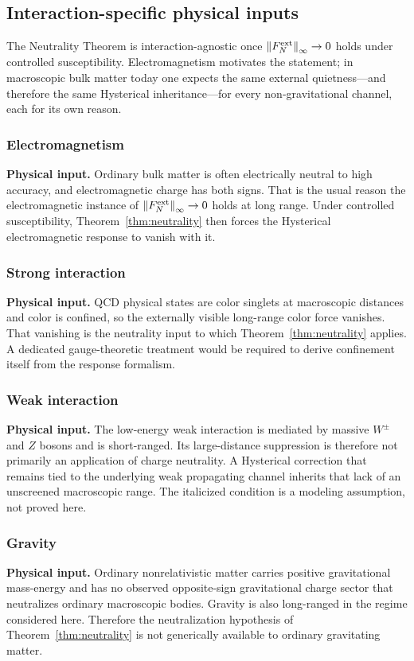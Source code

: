 \documentclass[11pt]{article}
\theoremstyle{definition}
\theoremstyle{remark}
\newcommand{\norm}[1]{\left\lVert #1\right\rVert}
\begin{document}
\subsection{Interaction-specific physical inputs}
The Neutrality Theorem is interaction-agnostic once $\norm{F_N^{\rm ext}}_\infty\to0$ holds under controlled susceptibility.
Electromagnetism motivates the statement; in macroscopic bulk matter today one expects the same external quietness---and therefore the same Hysterical inheritance---for every non-gravitational channel, each for its own reason.

\subsubsection{Electromagnetism}
\textbf{Physical input.} Ordinary bulk matter is often electrically neutral to high accuracy, and electromagnetic charge has both signs.  That is the usual reason the electromagnetic instance of $\norm{F_N^{\rm ext}}_\infty\to0$ holds at long range.  Under controlled susceptibility, Theorem~\ref{thm:neutrality} then forces the Hysterical electromagnetic response to vanish with it.

\subsubsection{Strong interaction}
\textbf{Physical input.} QCD physical states are color singlets at macroscopic distances and color is confined, so the externally visible long-range color force vanishes.  That vanishing is the neutrality input to which Theorem~\ref{thm:neutrality} applies.  A dedicated gauge-theoretic treatment would be required to derive confinement itself from the response formalism.

\subsubsection{Weak interaction}
\textbf{Physical input.} The low-energy weak interaction is mediated by massive $W^\pm$ and $Z$ bosons and is short-ranged.  Its large-distance suppression is therefore not primarily an application of charge neutrality.  A Hysterical correction that remains tied to the underlying weak propagating channel inherits that lack of an unscreened macroscopic range.  The italicized condition is a modeling assumption, not proved here.

\subsubsection{Gravity}
\textbf{Physical input.} Ordinary nonrelativistic matter carries positive gravitational mass-energy and has no observed opposite-sign gravitational charge sector that neutralizes ordinary macroscopic bodies.  Gravity is also long-ranged in the regime considered here.  Therefore the neutralization hypothesis of Theorem~\ref{thm:neutrality} is not generically available to ordinary gravitating matter.
\end{document}
